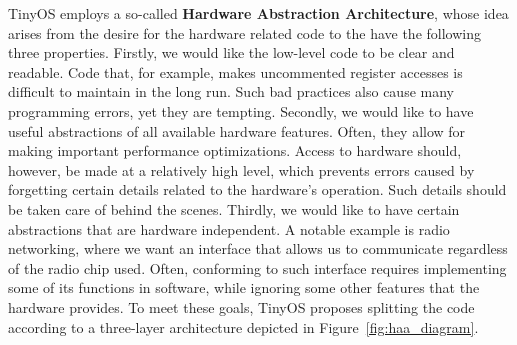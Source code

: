 TinyOS employs a so-called {\bf Hardware Abstraction Architecture}, whose idea arises from the desire for the hardware related code to the have the following three properties. Firstly, we would like the low-level code to be clear and readable. Code that, for example, makes uncommented register accesses is difficult to maintain in the long run. Such bad practices also cause many programming errors, yet they are tempting. Secondly, we would like to have useful abstractions of all available hardware features. Often, they allow for making important performance optimizations. Access to hardware should, however, be made at a relatively high level, which prevents errors caused by forgetting certain details related to the hardware's operation. Such details should be taken care of behind the scenes. Thirdly, we would like to have certain abstractions that are hardware independent. A notable example is radio networking, where we want an interface that allows us to communicate regardless of the radio chip used. Often, conforming to such interface requires implementing some of its functions in software, while ignoring some other features that the hardware provides. To meet these goals, TinyOS proposes splitting the code according to a three-layer architecture \cite{TEP2} depicted in Figure~\ref{fig:haa_diagram}.
